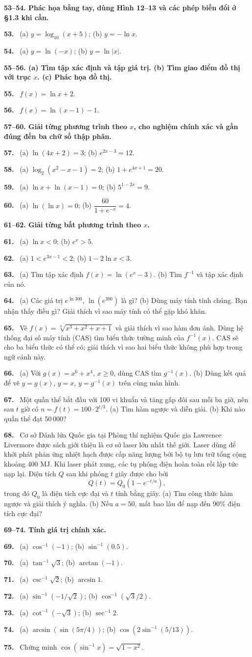 \documentclass[12pt,a4paper]{article}
\newcommand{\bt}[1]{\par\smallskip\noindent\textbf{#1.}\ }
\newcommand{\group}[1]{\par\medskip\noindent\textbf{#1}\par}
\begin{document}
\group{53–54. Phác họa bằng tay, dùng Hình 12–13 và các phép biến đổi ở §1.3 khi cần.}
\bt{53} (a) $y=\log_{10}(x+5)$; (b) $y=-\ln x$.
\bt{54} (a) $y=\ln(-x)$; (b) $y=\ln|x|$.
\group{55–56. (a) Tìm tập xác định và tập giá trị. (b) Tìm giao điểm đồ thị với trục $x$. (c) Phác họa đồ thị.}
\bt{55} $f(x)=\ln x+2$.
\bt{56} $f(x)=\ln(x-1)-1$.
\group{57–60. Giải từng phương trình theo $x$, cho nghiệm chính xác và gần đúng đến ba chữ số thập phân.}
\bt{57} (a) $\ln(4x+2)=3$; (b) $e^{2x-3}=12$.
\bt{58} (a) $\log_2(x^2-x-1)=2$; (b) $1+e^{4x+1}=20$.
\bt{59} (a) $\ln x+\ln(x-1)=0$; (b) $5^{1-2x}=9$.
\bt{60} (a) $\ln(\ln x)=0$; (b) $\dfrac{60}{1+e^{-x}}=4$.
\group{61–62. Giải từng bất phương trình theo $x$.}
\bt{61} (a) $\ln x<0$; (b) $e^x>5$.
\bt{62} (a) $1<e^{3x-1}<2$; (b) $1-2\ln x<3$.
\bt{63} (a) Tìm tập xác định $f(x)=\ln(e^x-3)$. (b) Tìm $f^{-1}$ và tập xác định của nó.
\bt{64} (a) Các giá trị $e^{\ln300}$, $\ln(e^{300})$ là gì? (b) Dùng máy tính tính chúng. Bạn nhận thấy điều gì? Giải thích vì sao máy tính có thể gặp khó khăn.
\bt{65} Vẽ $f(x)=\sqrt[3]{x^3+x^2+x+1}$ và giải thích vì sao hàm đơn ánh. Dùng hệ thống đại số máy tính (CAS) tìm biểu thức tường minh của $f^{-1}(x)$. CAS sẽ cho ba biểu thức có thể có; giải thích vì sao hai biểu thức không phù hợp trong ngữ cảnh này.
\bt{66} (a) Với $g(x)=x^6+x^4$, $x\ge0$, dùng CAS tìm $g^{-1}(x)$. (b) Dùng kết quả để vẽ $y=g(x)$, $y=x$, $y=g^{-1}(x)$ trên cùng màn hình.
\bt{67} Một quần thể bắt đầu với 100 vi khuẩn và tăng gấp đôi sau mỗi ba giờ, nên sau $t$ giờ có $n=f(t)=100\cdot2^{t/3}$. (a) Tìm hàm ngược và diễn giải. (b) Khi nào quần thể đạt 50\,000?
\bt{68} Cơ sở Đánh lửa Quốc gia tại Phòng thí nghiệm Quốc gia Lawrence Livermore được sách giới thiệu là cơ sở laser lớn nhất thế giới. Laser dùng để khởi phát phản ứng nhiệt hạch được cấp năng lượng bởi bộ tụ lưu trữ tổng cộng khoảng 400 MJ. Khi laser phát xung, các tụ phóng điện hoàn toàn rồi lập tức nạp lại. Điện tích $Q$ sau khi phóng $t$ giây được cho bởi
\[Q(t)=Q_0(1-e^{-t/a}),\]
trong đó $Q_0$ là điện tích cực đại và $t$ tính bằng giây. (a) Tìm công thức hàm ngược và giải thích ý nghĩa. (b) Nếu $a=50$, mất bao lâu để nạp đến 90\% điện tích cực đại?
\group{69–74. Tính giá trị chính xác.}
\bt{69} (a) $\cos^{-1}(-1)$; (b) $\sin^{-1}(0.5)$.
\bt{70} (a) $\tan^{-1}\sqrt3$; (b) $\arctan(-1)$.
\bt{71} (a) $\csc^{-1}\sqrt2$; (b) $\arcsin1$.
\bt{72} (a) $\sin^{-1}(-1/\sqrt2)$; (b) $\cos^{-1}(\sqrt3/2)$.
\bt{73} (a) $\cot^{-1}(-\sqrt3)$; (b) $\sec^{-1}2$.
\bt{74} (a) $\arcsin(\sin(5\pi/4))$; (b) $\cos\left(2\sin^{-1}(5/13)\right)$.
\bt{75} Chứng minh $\cos(\sin^{-1}x)=\sqrt{1-x^2}$.
\end{document}
